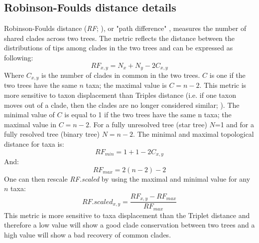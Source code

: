 \subsection{Robinson-Foulds distance details}
Robinson-Foulds distance (\textit{RF}; \citealp{RF1981}), or "path difference"
, measures the number of shared clades across two trees. The metric reflects the distance between the distributions of tips among clades in the two trees \citep{RF1981} and can be expressed as following:
\begin{equation}
RF_{x,y} = N_{x} + N_{y} - 2C_{x,y}
\end{equation}
Where $C_{x,y}$ is the number of clades in common in the two trees. $C$ %
is one if the two trees have the same $n$ taxa; the maximal value is $C = n-2$. %
This metric is more sensitive to taxon displacement than Triples distance (i.e. if one taxon moves out of a clade, then the clades are no longer considered similar; \citet{critchlowthe1996,johnson1998,wiensmissing2003}).
The minimal value of $C$ is equal to 1 if the two trees have the same n taxa;
the maximal value in $C = n-2$.
For a fully unresolved tree (star tree) $N$=1 and for a fully resolved tree (binary tree) $N = n-2$.
The minimal and maximal topological distance for  taxa is:
\begin{equation}
RF_{min} = 1 + 1 - 2C_{x,y}
\end{equation}
And:
\begin{equation}
RF_{max} = 2(n-2)-2
\end{equation}
One can then rescale \textit{RF.scaled} by using the maximal and minimal value for any $n$ taxa:
\begin{equation}
RF.scaled_{x,y} = \frac{RF_{x,y}-RF_{max}}{RF_{max}}
\end{equation}
This metric is more sensitive to taxa displacement than the Triplet distance \citep{critchlowthe1996,johnson1998,wiensmissing2003} and therefore a low value will show a good clade conservation between two trees and a high value will show a bad recovery of common clades.


